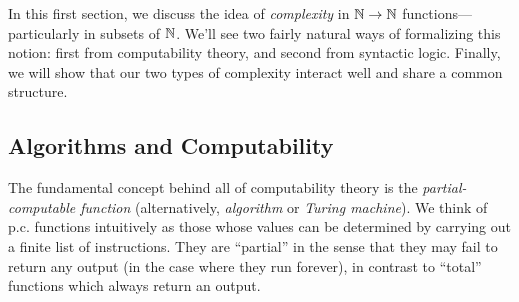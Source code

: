 \documentclass{amsart}
\begin{document}
	In this first section, we discuss the idea of \textit{complexity} in $\mathbb{N}\to \mathbb{N}$ functions---particularly in subsets of $\mathbb{N}$. We'll see two fairly natural ways of formalizing this notion: first from computability theory, and second from syntactic logic. Finally, we will show that our two types of complexity interact well and share a common structure.
	
	\subsection{Algorithms and Computability} The fundamental concept behind all of computability theory is the \textit{partial-computable function} (alternatively, \textit{algorithm} or \textit{Turing machine}). We think of p.c. functions intuitively as those whose values can be determined by carrying out a finite list of instructions. They are ``partial'' in the sense that they may fail to return any output (in the case where they run forever), in contrast to ``total'' functions which always return an output.\\
	
\end{document}
